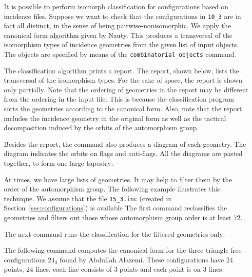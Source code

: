 \bigskip



It is possible to perform isomorph classification 
for configurations based on incidence files. 
Suppose we want to check that the configurations 
in \verb'10_3' are in fact all distinct, 
in the sense of being pairwise-nonisomorphic. 
We apply the 
canonical form algorithm given by Nauty.
This produces a transversal of the isomorphism types 
of incidence geometries from the given list of input objects.
The objects are specified by means of the \verb'combinatorial_objects' command. 


The classification algorithm prints a report. The report, shown below, 
lists the transversal of the isomorphism types. 
For the sake of space, the report is shown only partially.
Note that the ordering of geometries 
in the report may be different from the ordering in the input file. 
This is because the classification program 
sorts the geometries according to the canonical form.
Also, note that the report includes the incidence geometry in the original form 
as well as the tactical decomposition 
induced by the orbits of the automorphism group.

Besides the report, the command also produces a diagram of each geometry. 
The diagram indicates the orbits on flags and anti-flags. 
All the diagrams are pasted together, to form one large tapestry:



\bigskip


At times, we have large lists of geometries. It may help to filter them by the order of the automorphism group. 
The following example illustrates this technique. 
We assume that the file \verb'15_3.inc' (created in Section~\ref{sec:configurations}) is available
The first command reclassifies the geometries and filters out those whose automorphism group order is at least 72. 


The next command runs the classification for the filtered geometries only:





\bigskip





The following command computes 
the canonical form for the three triangle-free 
configurations $24_3$ found by Abdullah Alazemi. 
These configurations have $24$ points,
$24$ lines, each line consists of $3$ points 
and each point is on $3$ lines. 

